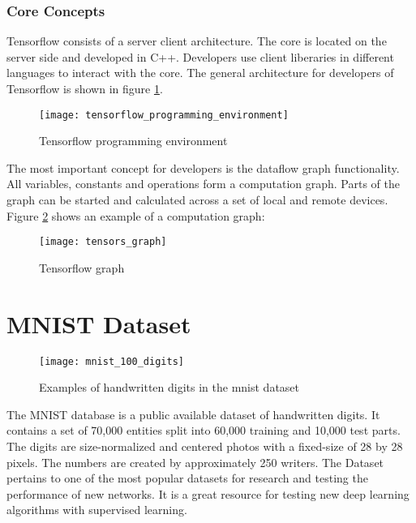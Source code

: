 \subsubsection*{Core Concepts}

Tensorflow consists of a server client architecture.
The core is located on the server side and developed in C++.
Developers use client liberaries in different languages to interact with the core.
The general architecture for developers of Tensorflow is shown in figure \ref{fig:tensorflow_programming_environment_image}.

\begin{figure}[H]
    \centering
    \texttt{[image: tensorflow\_programming\_environment]}
    \caption{\cite{tensorflow_programming_environment_image} Tensorflow programming environment}
    \label{fig:tensorflow_programming_environment_image}
\end{figure}

The most important concept for developers is the dataflow graph functionality.
All variables, constants and operations form a computation graph.
Parts of the graph can be started and calculated across a set of local and remote devices.
Figure \ref{fig:tensorflow_graph_image} shows an example of a computation graph:

\begin{figure}[H]
    \centering
    \texttt{[image: tensors\_graph]}
    \caption{\cite{tensorflow_graph_image} Tensorflow graph}
    \label{fig:tensorflow_graph_image}
\end{figure}

\section{MNIST Dataset}

\begin{figure}[H]
    \centering
    \texttt{[image: mnist\_100\_digits]}
    \caption{\cite{mnist_examples_image} Examples of handwritten digits in the mnist dataset}
    \label{fig:mnist_examples}
\end{figure}

The MNIST database is a public available dataset of handwritten digits.
It contains a set of 70,000 entities split into 60,000 training and 10,000 test parts.
The digits are size-normalized and centered photos with a fixed-size of 28 by 28 pixels.
The numbers are created by approximately 250 writers. 
\cite{mnist-database}
The Dataset pertains to one of the most popular datasets for research and testing the performance of new networks.
It is a great resource for testing new deep learning algorithms with supervised learning.



